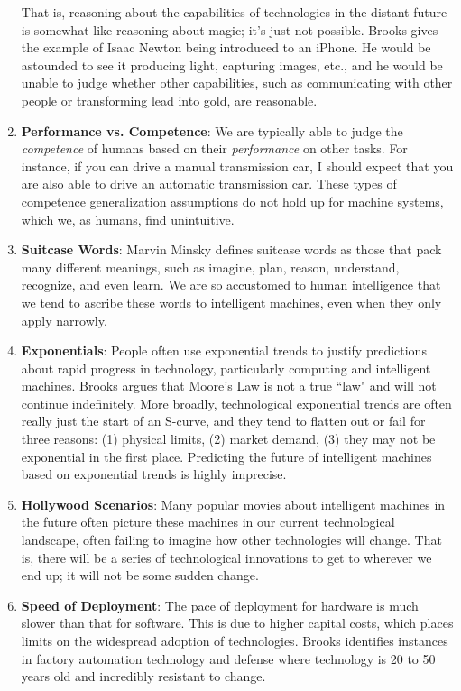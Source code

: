 \begin{enumerate}
	That is, reasoning about the capabilities of technologies in the distant future is somewhat like reasoning about magic; it's just not possible. Brooks gives the example of Isaac Newton being introduced to an iPhone. He would be astounded to see it producing light, capturing images, etc., and he would be unable to judge whether other capabilities, such as communicating with other people or transforming lead into gold, are reasonable.
	\item \textbf{Performance vs. Competence}: We are typically able to judge the \textit{competence} of humans based on their \textit{performance} on other tasks. For instance, if you can drive a manual transmission car, I should expect that you are also able to drive an automatic transmission car. These types of competence generalization assumptions do not hold up for machine systems, which we, as humans, find unintuitive.
	\item \textbf{Suitcase Words}: Marvin Minsky defines suitcase words as those that pack many different meanings, such as imagine, plan, reason, understand, recognize, and even learn. We are so accustomed to human intelligence that we tend to ascribe these words to intelligent machines, even when they only apply narrowly.
	\item \textbf{Exponentials}: People often use exponential trends to justify predictions about rapid progress in technology, particularly computing and intelligent machines. Brooks argues that Moore's Law is not a true ``law" and will not continue indefinitely. More broadly, technological exponential trends are often really just the start of an S-curve, and they tend to flatten out or fail for three reasons: (1) physical limits, (2) market demand, (3) they may not be exponential in the first place. Predicting the future of intelligent machines based on exponential trends is highly imprecise.
	\item \textbf{Hollywood Scenarios}: Many popular movies about intelligent machines in the future often picture these machines in our current technological landscape, often failing to imagine how other technologies will change. That is, there will be a series of technological innovations to get to wherever we end up; it will not be some sudden change.
	\item \textbf{Speed of Deployment}: The pace of deployment for hardware is much slower than that for software. This is due to higher capital costs, which places limits on the widespread adoption of technologies. Brooks identifies instances in factory automation technology and defense where technology is 20 to 50 years old and incredibly resistant to change. 
\end{enumerate}











